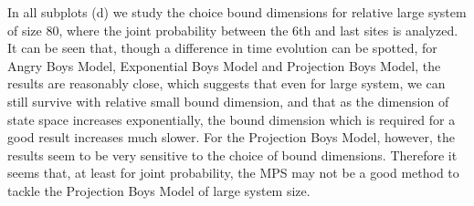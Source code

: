 \documentclass[english]{article}[12pt]
\begin{document}
In all subplots (d) we study the choice bound dimensions for relative large system of size 80, where the joint probability between the 6th and last sites is analyzed. It can be seen that, though a difference in time evolution can be spotted, for Angry Boys Model, Exponential Boys Model and Projection Boys Model, the results are reasonably close, which suggests that even for large system, we can still survive with relative small bound dimension, and that as the dimension of state space increases exponentially, the bound dimension which is required for a good result increases much slower. For the Projection Boys Model, however, the results seem to be very sensitive to the choice of bound dimensions. Therefore it seems that, at least for joint probability, the MPS may not be a good method to tackle the Projection Boys Model of large system size.
\end{document}
